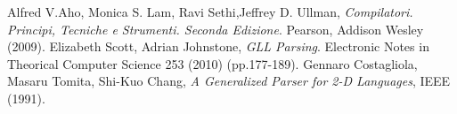 \begin{thebibliography}{9}
Alfred V.Aho, Monica S. Lam, Ravi Sethi,Jeffrey D. Ullman,
\emph{Compilatori. Principi, Tecniche e Strumenti. Seconda Edizione}. Pearson, Addison Wesley (2009). 
Elizabeth Scott, Adrian Johnstone,
\emph{GLL Parsing}. Electronic Notes in Theorical Computer Science 253 (2010) (pp.177-189).
Gennaro Costagliola, Masaru Tomita, Shi-Kuo Chang,
\emph{A Generalized Parser for 2-D Languages}, IEEE (1991).
\end{thebibliography}